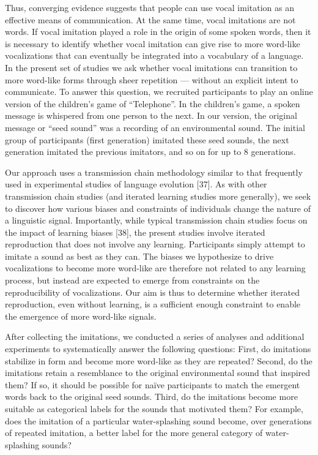 \documentclass[english,floatsintext,man]{apa6}
\theoremstyle{definition}
\theoremstyle{definition}
\theoremstyle{definition}
\theoremstyle{remark}
\begin{document}
Thus, converging evidence suggests that people can use vocal imitation
as an effective means of communication. At the same time, vocal
imitations are not words. If vocal imitation played a role in the origin
of some spoken words, then it is necessary to identify whether vocal
imitation can give rise to more word-like vocalizations that can
eventually be integrated into a vocabulary of a language. In the present
set of studies we ask whether vocal imitations can transition to more
word-like forms through sheer repetition --- without an explicit intent
to communicate. To answer this question, we recruited participants to
play an online version of the children's game of \enquote{Telephone}. In
the children's game, a spoken message is whispered from one person to
the next. In our version, the original message or \enquote{seed sound}
was a recording of an environmental sound. The initial group of
participants (first generation) imitated these seed sounds, the next
generation imitated the previous imitators, and so on for up to 8
generations.

Our approach uses a transmission chain methodology similar to that
frequently used in experimental studies of language evolution {[}37{]}.
As with other transmission chain studies (and iterated learning studies
more generally), we seek to discover how various biases and constraints
of individuals change the nature of a linguistic signal. Importantly,
while typical transmission chain studies focus on the impact of learning
biases {[}38{]}, the present studies involve iterated reproduction that
does not involve any learning. Participants simply attempt to imitate a
sound as best as they can. The biases we hypothesize to drive
vocalizations to become more word-like are therefore not related to any
learning process, but instead are expected to emerge from constraints on
the reproducibility of vocalizations. Our aim is thus to determine
whether iterated reproduction, even without learning, is a sufficient
enough constraint to enable the emergence of more word-like signals.

After collecting the imitations, we conducted a series of analyses and
additional experiments to systematically answer the following questions:
First, do imitations stabilize in form and become more word-like as they
are repeated? Second, do the imitations retain a resemblance to the
original environmental sound that inspired them? If so, it should be
possible for naïve participants to match the emergent words back to the
original seed sounds. Third, do the imitations become more suitable as
categorical labels for the sounds that motivated them? For example, does
the imitation of a particular water-splashing sound become, over
generations of repeated imitation, a better label for the more general
category of water-splashing sounds?
\end{document}
